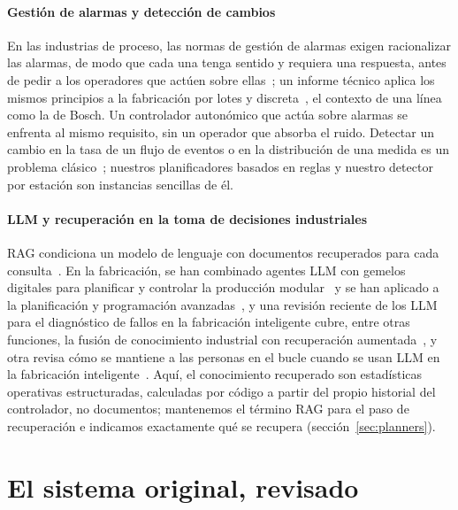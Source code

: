 \documentclass[preprint,11pt]{elsarticle}
\begin{document}
\paragraph{Gestión de alarmas y detección de cambios}
En las industrias de proceso, las normas de gestión de alarmas exigen racionalizar las alarmas, de modo que cada una tenga sentido y requiera una respuesta, antes de pedir a los operadores que actúen sobre ellas~\cite{isa182}; un informe técnico aplica los mismos principios a la fabricación por lotes y discreta~\cite{isatr1826}, el contexto de una línea como la de Bosch. Un controlador autonómico que actúa sobre alarmas se enfrenta al mismo requisito, sin un operador que absorba el ruido. Detectar un cambio en la tasa de un flujo de eventos o en la distribución de una medida es un problema clásico~\cite{basseville1993detection}; nuestros planificadores basados en reglas y nuestro detector por estación son instancias sencillas de él.

\paragraph{LLM y recuperación en la toma de decisiones industriales}
RAG condiciona un modelo de lenguaje con documentos recuperados para cada consulta~\cite{lewis2020rag}. En la fabricación, se han combinado agentes LLM con gemelos digitales para planificar y controlar la producción modular~\cite{xia2023towards} y se han aplicado a la planificación y programación avanzadas~\cite{li2026a4ps}, y una revisión reciente de los LLM para el diagnóstico de fallos en la fabricación inteligente cubre, entre otras funciones, la fusión de conocimiento industrial con recuperación aumentada~\cite{thuan2026review}, y otra revisa cómo se mantiene a las personas en el bucle cuando se usan LLM en la fabricación inteligente~\cite{sadeqi2026hitl}. Aquí, el conocimiento recuperado son estadísticas operativas estructuradas, calculadas por código a partir del propio historial del controlador, no documentos; mantenemos el término RAG para el paso de recuperación e indicamos exactamente qué se recupera (sección~\ref{sec:planners}).

\section{El sistema original, revisado}
\label{sec:revisit}
\end{document}
